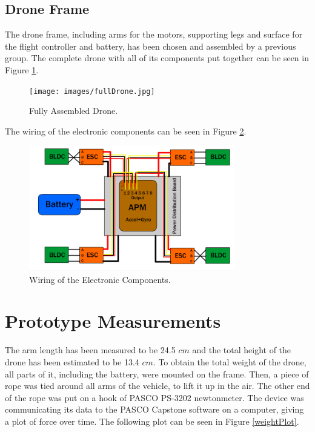 \subsection{Drone Frame}
The drone frame, including arms for the motors, supporting legs and surface for the flight controller and battery, has been chosen and assembled by a previous group. The complete drone with all of its components put together can be seen in Figure \ref{fullDrone}.

\begin{figure}[H]
  \centering
    \texttt{[image: images/fullDrone.jpg]}
	\caption{Fully Assembled Drone.}
	\label{fullDrone}
\end{figure}

The wiring of the electronic components can be seen in Figure \ref{wiring}.
\begin{figure}[H]
  \centering
    \includegraphics[width=0.8\textwidth]{images/Wiring2.png}
	\caption{Wiring of the Electronic Components.}
	\label{wiring}
\end{figure}

\section{Prototype Measurements}
The arm length has been measured to be 24.5 $cm$ and the total height of the drone has been estimated to be 13.4 $cm$.
To obtain the total weight of the drone, all parts of it, including the battery, were mounted on the frame. Then, a piece of rope was tied around all arms of the vehicle, to lift it up in the air. The other end of the rope was put on a hook of PASCO PS-3202 newtonmeter. The device was communicating its data to the PASCO Capstone software on a computer, giving a plot of force over time. The following plot can be seen in Figure \ref{weightPlot}.

